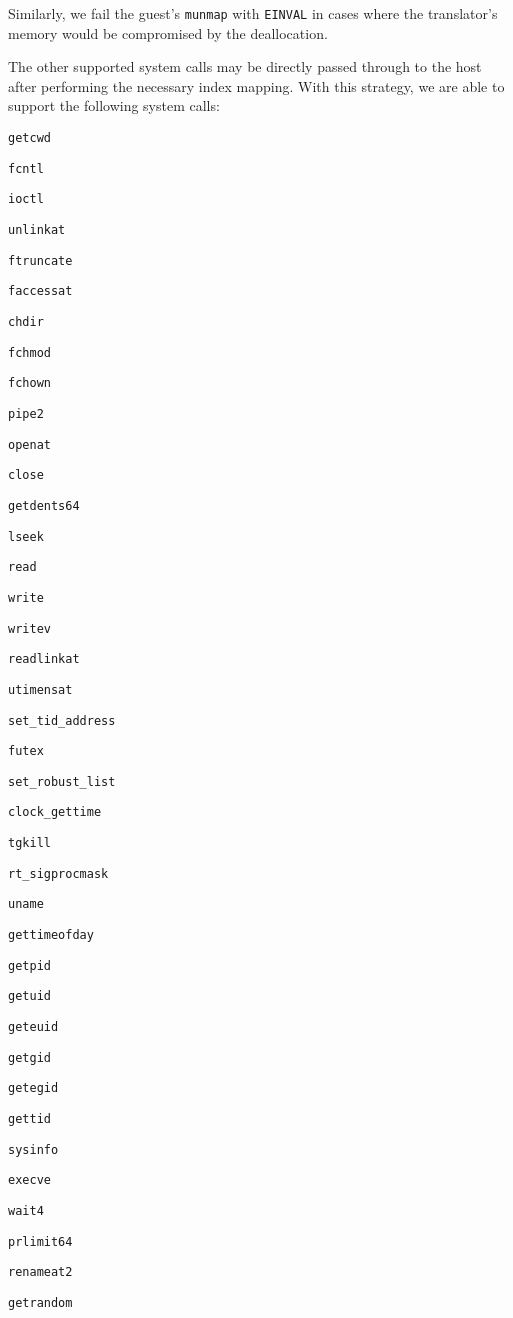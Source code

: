 \begin{description}
	Similarly, we fail the guest's \texttt{munmap} with \texttt{EINVAL} in cases where the translator's memory would be compromised by the deallocation.
\end{description}

The other supported system calls may be directly passed through to the host after performing the necessary index mapping.
With this strategy, we are able to support the following system calls:
\begin{multicols}{4}
	\begin{itemize*}
		\item \texttt{getcwd}
		\item \texttt{fcntl}
		\item \texttt{ioctl}
		\item \texttt{unlinkat}
		\item \texttt{ftruncate}
		\item \texttt{faccessat}
		\item \texttt{chdir}
		\item \texttt{fchmod}
		\item \texttt{fchown}
		\item \texttt{pipe2}
		\item \texttt{openat}
		\item \texttt{close}
		\item \texttt{getdents64}
		\item \texttt{lseek}
		\item \texttt{read}
		\item \texttt{write}
		\item \texttt{writev}
		\item \texttt{readlinkat}
		\item \texttt{utimensat}
		\item \texttt{set\_tid\_address}
		\item \texttt{futex}
		\item \texttt{set\_robust\_list}
		\item \texttt{clock\_gettime}
		\item \texttt{tgkill}
		\item \texttt{rt\_sigprocmask}
		\item \texttt{uname}
		\item \texttt{gettimeofday}
		\item \texttt{getpid}
		\item \texttt{getuid}
		\item \texttt{geteuid}
		\item \texttt{getgid}
		\item \texttt{getegid}
		\item \texttt{gettid}
		\item \texttt{sysinfo}
		\item \texttt{execve}
		\item \texttt{wait4}
		\item \texttt{prlimit64}
		\item \texttt{renameat2}
		\item \texttt{getrandom}
	\end{itemize*}
\end{multicols}

